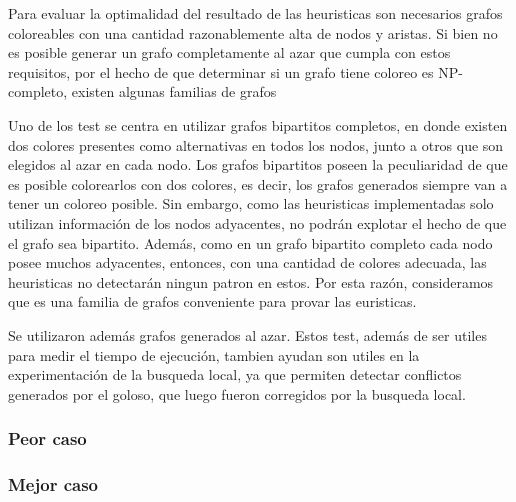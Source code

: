 Para evaluar la optimalidad del resultado de las heuristicas son necesarios grafos coloreables con una cantidad razonablemente alta de nodos y aristas. Si bien no es posible generar un grafo completamente al azar que cumpla con estos requisitos, por el hecho de que determinar si un grafo tiene coloreo es NP-completo, existen algunas familias de grafos

Uno de los test se centra en utilizar grafos bipartitos completos, en donde existen dos colores presentes como alternativas en todos los nodos, junto a otros que son elegidos al azar en cada nodo. Los grafos bipartitos poseen la peculiaridad de que es posible colorearlos con dos colores, es decir, los grafos generados siempre van a tener un coloreo posible.
Sin embargo, como las heuristicas implementadas solo utilizan información de los nodos adyacentes, no podrán explotar el hecho de que el grafo sea bipartito. Además, como en un grafo bipartito completo cada nodo posee muchos adyacentes, entonces, con una cantidad de colores adecuada, las heuristicas no detectarán ningun patron en estos. Por esta razón, consideramos que es una familia de grafos conveniente para provar las euristicas.


Se utilizaron además grafos generados al azar. Estos test, además de ser utiles para medir el tiempo de ejecución, tambien ayudan son utiles en la experimentación de la busqueda local, ya que permiten detectar conflictos generados por el goloso, que luego fueron corregidos por la busqueda local.


\subsubsection{Peor caso}



\subsubsection{Mejor caso}
